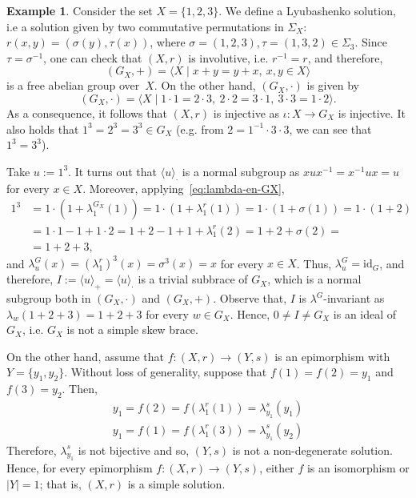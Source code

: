 \documentclass[12pt, a4paper, english]{article}
\theoremstyle{definition}
\newtheorem{exemple}[teorema]{Example}
\theoremstyle{remark}
\newcommand{\bigcdot}{\boldsymbol{\cdot}}
\begin{document}
\begin{exemple}
\label{ex:contraex-Xsimple-GXnosimple}
Consider the set $X = \{1,2,3\}$. We define a Lyubashenko solution, i.e a solution given by two commutative permutations in $\Sigma_X$: $r(x,y) = (\sigma(y), \tau(x))$, where $\sigma = (1,2,3), \tau = (1,3,2) \in \Sigma_3$. Since $\tau = \sigma^{-1}$, one can check that $(X,r)$ is involutive, i.e. $r^{-1} = r$, and therefore,
\[ (G_X,+) = \langle X \mid x+y = y+x, \ x,y\in X\rangle\]
is a free abelian group over~$X$. On the other hand, $(G_X,\cdot)$ is given by 
\[ (G_X,\cdot) = \langle X \mid 1\cdot 1 = 2 \cdot 3, \  2\cdot 2 = 3\cdot 1, \  3\cdot 3 = 1\cdot 2 \rangle.\]
As a consequence, it follows that $(X,r)$ is injective as $\iota\colon X \rightarrow G_X$ is injective. It also holds that $1^3 = 2^3 = 3^3 \in G_X$ (e.g. from $2 = 1^{-1}\cdot 3 \cdot 3$, we can see that $1^3 = 3^3$). 

Take $u:= 1^3$. It turns out that $\langle u \rangle_{\bigcdot}$ is a normal subgroup as $xux^{-1} = x^{-1}ux = u$ for every $x\in X$. Moreover, applying~\eqref{eq:lambda-en-GX},
\begin{align*}
 1^3 & = 1\cdot (1 + \lambda_1^{G_X}(1)) = 1\cdot (1 + \lambda_1^r(1)) = 1\cdot (1 + \sigma(1)) = 1 \cdot (1+2) \\
 & = 1 \cdot 1 - 1 + 1 \cdot 2 = 1 + 2 -1 + 1 + \lambda_1^r(2) = 1 + 2 + \sigma(2) = \\
 & = 1 + 2 + 3,
\end{align*}
and $\lambda_u^G(x) = (\lambda_1^r)^3(x) = \sigma^3(x) = x$ for every $x\in X$. Thus, $\lambda_u^G = \mathrm{id}_G$, and therefore, $I:= \langle u\rangle_+ = \langle u \rangle_{\bigcdot}$ is a trivial subbrace of $G_X$, which is a normal subgroup both in $(G_X,\cdot)$ and $(G_X,+)$. Observe that, $I$ is $\lambda^G$-invariant as $\lambda_w(1+2+3) = 1+2+3$ for every $w\in G_X$. Hence, $0\neq I \neq G_X$ is an ideal of $G_X$, i.e. $G_X$ is not a simple skew brace.

On the other hand, assume that $f \colon (X,r) \rightarrow (Y,s)$ is an epimorphism with $Y = \{y_1,y_2\}$. Without loss of generality, suppose that $f(1) = f(2) = y_1$ and $f(3) = y_2$. Then, 
\[ \begin{array}{l}
 y_1 = f(2) = f(\lambda^r_1(1)) = \lambda^s_{y_1}(y_1) \\
 y_1 = f(1) = f(\lambda^r_1(3)) = \lambda^s_{y_1}(y_2)
 \end{array}\]
Therefore, $\lambda^s_{y_1}$ is not bijective and so, $(Y,s)$ is not a non-degenerate solution. Hence, for every epimorphism $f\colon (X,r) \rightarrow (Y,s)$, either $f$ is an isomorphism or $|Y| = 1$; that is, $(X,r)$ is a simple solution.
\end{exemple}
\end{document}
